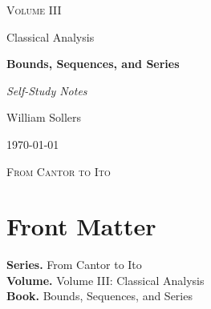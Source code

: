 \documentclass[12pt, a4paper]{report}
\begin{document}
\ExplSyntaxOff
\renewcommand{\familydefault}{\rmdefault}

\begin{titlepage}
\centering
\vspace*{3.5cm}

{\Large\scshape Volume III\par}
\vspace{0.35cm}
{\large Classical Analysis\par}

\vspace{1.4cm}

{\Huge\bfseries Bounds, Sequences, and Series\par}

\vspace{0.6cm}
{\large\itshape Self-Study Notes\par}

\vfill

{\large William Sollers\par}
\vspace{0.35cm}
{\large \today\par}

\vfill

{\large\scshape From Cantor to Ito\par}
\end{titlepage}

\clearpage
\thispagestyle{plain}
\chapter*{Front Matter}
\noindent\textbf{Series.} From Cantor to Ito\\[0.5em]
\textbf{Volume.} Volume III: Classical Analysis\\[0.5em]
\textbf{Book.} Bounds, Sequences, and Series

\clearpage
\tableofcontents
\clearpage
{}



\clearpage



\printindex[tech]
\printindex[dep]
\end{document}
